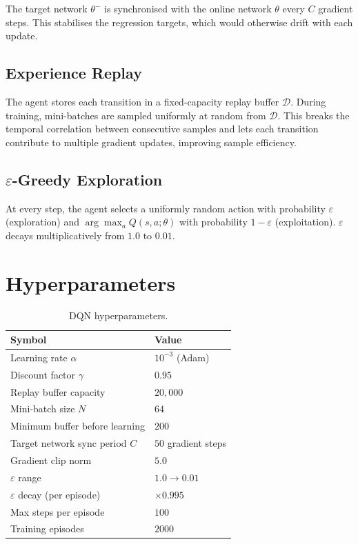 \documentclass[11pt]{article}
\begin{document}
The target network $\theta^{-}$ is synchronised with the online network $\theta$ every $C$ gradient steps. This stabilises the regression targets, which would otherwise drift with each update.

\subsection{Experience Replay}

The agent stores each transition in a fixed-capacity replay buffer $\mathcal{D}$. During training, mini-batches are sampled uniformly at random from $\mathcal{D}$. This breaks the temporal correlation between consecutive samples and lets each transition contribute to multiple gradient updates, improving sample efficiency.

\subsection{$\varepsilon$-Greedy Exploration}

At every step, the agent selects a uniformly random action with probability $\varepsilon$ (exploration) and $\arg\max_a Q(s,a;\theta)$ with probability $1-\varepsilon$ (exploitation). $\varepsilon$ decays multiplicatively from $1.0$ to $0.01$.

\section{Hyperparameters}

\begin{table}[H]
\centering
\begin{tabular}{@{}ll@{}}
\toprule
\textbf{Symbol} & \textbf{Value} \\
\midrule
Learning rate $\alpha$               & $10^{-3}$ (Adam) \\
Discount factor $\gamma$             & $0.95$ \\
Replay buffer capacity               & $20{,}000$ \\
Mini-batch size $N$                  & $64$ \\
Minimum buffer before learning       & $200$ \\
Target network sync period $C$       & $50$ gradient steps \\
Gradient clip norm                   & $5.0$ \\
$\varepsilon$ range                  & $1.0 \rightarrow 0.01$ \\
$\varepsilon$ decay (per episode)    & $\times 0.995$ \\
Max steps per episode                & $100$ \\
Training episodes                    & $2000$ \\
\bottomrule
\end{tabular}
\caption{DQN hyperparameters.}
\end{table}
\end{document}
